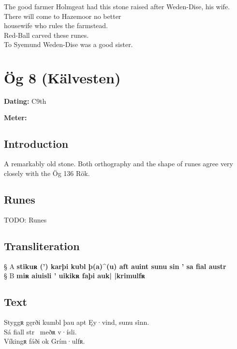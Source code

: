 \bpb The good farmer Holmgeat had this stone raised after Weden-Dise, his wife. \\
There will come to Hazemoor no better \\
housewife who rules the farmstead. \\
Red-Ball carved these runes. \\
To Syemund Weden-Dise was a good sister.\epb\epg

\sectionline\clearpage


\section{Ög 8 (Kälvesten)}

\begin{flushright}%
\textbf{Dating:} C9th

\textbf{Meter:} \Fornyrdislag
\end{flushright}%

\subsection{Introduction}

A remarkably old stone.  Both orthography and the shape of runes agree very closely with the Ög 136 Rök.

\subsection{Runes}

TODO: Runes%

\subsection{Transliteration}

§ A \textbf{stikuʀ (’) karþi kubl þ(a)\textasciicircum (u) aft auint sunu sin ’ sa fial austr} \\
§ B \textbf{miʀ aiuisli ’ uikikʀ faþi auk| |krimulfʀ}

\subsection{Text}

\bpg\bpa[0]%
\startsub Styggʀ gęrði kumbl þau apt Ęy·vind, sunu si̇nn.\endsub \\
Sá fiall str \hld\ meðʀ v·ísli. \\
Víkingʀ fáði ok Grím·ulfʀ.\epa

